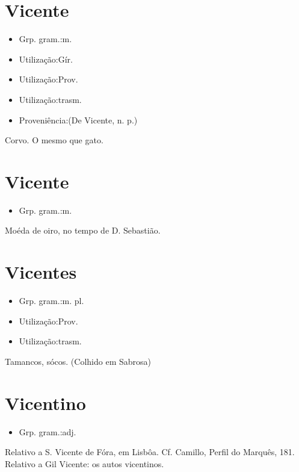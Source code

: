 \documentclass{article}
\begin{document}
\section{Vicente}
\begin{itemize}
\item {Grp. gram.:m.}
\end{itemize}
\begin{itemize}
\item {Utilização:Gír.}
\end{itemize}
\begin{itemize}
\item {Utilização:Prov.}
\end{itemize}
\begin{itemize}
\item {Utilização:trasm.}
\end{itemize}
\begin{itemize}
\item {Proveniência:(De \textunderscore Vicente\textunderscore , n. p.)}
\end{itemize}
Corvo.
O mesmo que \textunderscore gato\textunderscore .
\section{Vicente}
\begin{itemize}
\item {Grp. gram.:m.}
\end{itemize}
Moéda de oiro, no tempo de D. Sebastião.
\section{Vicentes}
\begin{itemize}
\item {Grp. gram.:m. pl.}
\end{itemize}
\begin{itemize}
\item {Utilização:Prov.}
\end{itemize}
\begin{itemize}
\item {Utilização:trasm.}
\end{itemize}
Tamancos, sócos. (Colhido em Sabrosa)
\section{Vicentino}
\begin{itemize}
\item {Grp. gram.:adj.}
\end{itemize}
Relativo a S. Vicente de Fóra, em Lisbôa. Cf. Camillo, \textunderscore Perfil do Marquês\textunderscore , 181.
Relativo a Gil Vicente: \textunderscore os autos vicentinos\textunderscore .
\end{document}
